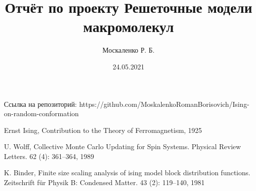 \documentclass[a4paper,12pt]{article}
\title{Отчёт по проекту Решеточные модели макромолекул}
\author{Москаленко Р. Б.}
\date{24.05.2021}
\begin{document}
\maketitle

%





%



\begin{thebibliography}{9}
 Ссылка на репозиторий: https://github.com/MoskalenkoRomanBorisovich/Ising-on-random-conformation 
 
Ernst Ising, Contribution to the Theory of Ferromagnetism, 1925


 U. Wolff, Collective Monte Carlo Updating for Spin Systems. Physical Review Letters. 62 (4): 361–364, 1989
 
 K. Binder, Finite size scaling analysis of ising model block distribution functions. Zeitschrift für Physik B: Condensed Matter. 43 (2): 119–140, 1981

\end{thebibliography}
\end{document}
